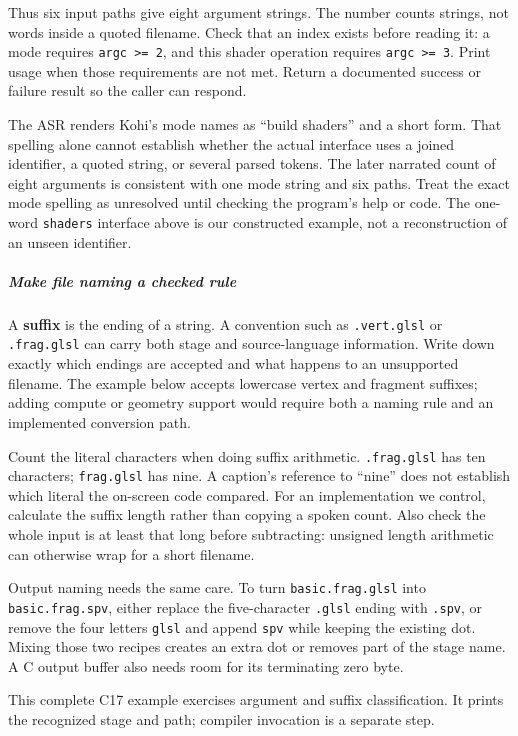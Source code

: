 Thus six input paths give eight argument strings. The number counts strings, not words inside a quoted filename. Check that an index exists before reading it: a mode requires \texttt{argc\ \textgreater{}=\ 2}, and this shader operation requires \texttt{argc\ \textgreater{}=\ 3}. Print usage when those requirements are not met. Return a documented success or failure result so the caller can respond.

The ASR renders Kohi's mode names as ``build shaders'' and a short form. That spelling alone cannot establish whether the actual interface uses a joined identifier, a quoted string, or several parsed tokens. The later narrated count of eight arguments is consistent with one mode string and six paths. Treat the exact mode spelling as unresolved until checking the program's help or code. The one-word \texttt{shaders} interface above is our constructed example, not a reconstruction of an unseen identifier.

\subparagraph{Make file naming a checked rule}\label{make-file-naming-a-checked-rule}

A \textbf{suffix} is the ending of a string. A convention such as \texttt{.vert.glsl} or \texttt{.frag.glsl} can carry both stage and source-language information. Write down exactly which endings are accepted and what happens to an unsupported filename. The example below accepts lowercase vertex and fragment suffixes; adding compute or geometry support would require both a naming rule and an implemented conversion path.

Count the literal characters when doing suffix arithmetic. \texttt{.frag.glsl} has ten characters; \texttt{frag.glsl} has nine. A caption's reference to ``nine'' does not establish which literal the on-screen code compared. For an implementation we control, calculate the suffix length rather than copying a spoken count. Also check the whole input is at least that long before subtracting: unsigned length arithmetic can otherwise wrap for a short filename.

Output naming needs the same care. To turn \texttt{basic.frag.glsl} into \texttt{basic.frag.spv}, either replace the five-character \texttt{.glsl} ending with \texttt{.spv}, or remove the four letters \texttt{glsl} and append \texttt{spv} while keeping the existing dot. Mixing those two recipes creates an extra dot or removes part of the stage name. A C output buffer also needs room for its terminating zero byte.

This complete C17 example exercises argument and suffix classification. It prints the recognized stage and path; compiler invocation is a separate step.

